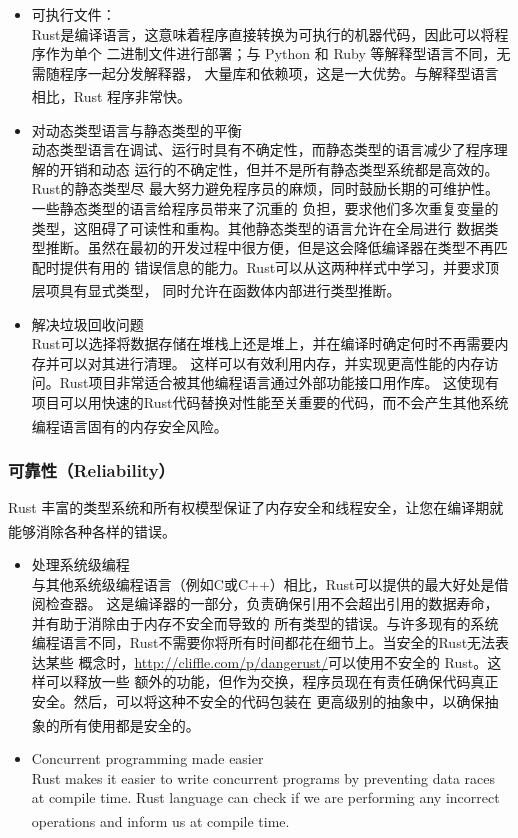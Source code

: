 \documentclass[UTF8,fontset=none,linespread=1.15]{ctexart}
\let\nosupcite\cite
\renewcommand*{\cite}[1]{\textsuperscript{\nosupcite{#1}}}
\begin{document}
\begin{itemize}
\item 可执行文件：\\
  Rust是编译语言，这意味着程序直接转换为可执行的机器代码，因此可以将程序作为单个
  二进制文件进行部署；与 Python 和 Ruby 等解释型语言不同，无需随程序一起分发解释器，
  大量库和依赖项，这是一大优势。与解释型语言相比，Rust 程序非常快。\cite{bib:4-rust-go-cmp}

\item 对动态类型语言与静态类型的平衡\\
  动态类型语言在调试、运行时具有不确定性，而静态类型的语言减少了程序理解的开销和动态
  运行的不确定性，但并不是所有静态类型系统都是高效的。Rust的静态类型尽
  最大努力避免程序员的麻烦，同时鼓励长期的可维护性。一些静态类型的语言给程序员带来了沉重的
  负担，要求他们多次重复变量的类型，这阻碍了可读性和重构。其他静态类型的语言允许在全局进行
  数据类型推断。虽然在最初的开发过程中很方便，但是这会降低编译器在类型不再匹配时提供有用的
  错误信息的能力。Rust可以从这两种样式中学习，并要求顶层项具有显式类型，
  同时允许在函数体内部进行类型推断。\cite{bib:3-why-rust-pop}

\item 解决垃圾回收问题\\
  Rust可以选择将数据存储在堆栈上还是堆上，并在编译时确定何时不再需要内存并可以对其进行清理。
  这样可以有效利用内存，并实现更高性能的内存访问。Rust项目非常适合被其他编程语言通过外部功能接口用作库。
  这使现有项目可以用快速的Rust代码替换对性能至关重要的代码，而不会产生其他系统编程语言固有的内存安全风险。
  \cite{bib:3-why-rust-pop}
\end{itemize}

\subsubsection{可靠性（Reliability）}

Rust 丰富的类型系统和所有权模型保证了内存安全和线程安全，让您在编译期就能够消除各种各样的错误。\cite{bib:1-rust-lang}

\begin{itemize}
\item 处理系统级编程\\
  与其他系统级编程语言（例如C或C++）相比，Rust可以提供的最大好处是借阅检查器。
  这是编译器的一部分，负责确保引用不会超出引用的数据寿命，并有助于消除由于内存不安全而导致的
  所有类型的错误。与许多现有的系统编程语言不同，Rust不需要你将所有时间都花在细节上。当安全的Rust无法表达某些
  概念时，\url{http://cliffle.com/p/dangerust/}可以使用不安全的 Rust。这样可以释放一些
  额外的功能，但作为交换，程序员现在有责任确保代码真正安全。然后，可以将这种不安全的代码包装在
  更高级别的抽象中，以确保抽象的所有使用都是安全的。\cite{bib:3-why-rust-pop}

\item Concurrent programming made easier\\
  Rust makes it easier to write concurrent programs by preventing data races at
  compile time. Rust language can
  check if we are performing any incorrect operations and inform
  us at compile time.\cite{bib:6-why-rust-pop-2}
\end{itemize}
\end{document}
